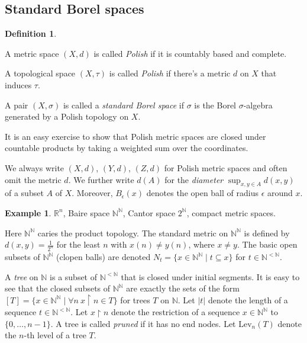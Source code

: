 \documentclass[10pt]{amsart}
\newcommand{\spl}{\mathrm{split}}
\newcommand{\RR}{\mathbb{R}}
\newcommand{\NN}{\mathbb{N}}
\newcommand{\Lev}{\mathrm{Lev}}
\theoremstyle{definition}
\newtheorem{definition}[theorem]{Definition}
\newtheorem{example}[theorem]{Example}
\theoremstyle{remark}
\newenvironment{enumerate-(a)}{\begin{enumerate}[label={\upshape (\alph*)}, leftmargin=2pc]}{\end{enumerate}}
\begin{document}
\subsection{Standard Borel spaces} 

\begin{definition} 
\begin{enumerate-(a)} 
\item 
A metric space $(X,d)$ is called \emph{Polish} if it is countably based and complete. 
\item 
A topological space $(X,\tau)$ is called \emph{Polish} if there's a metric $d$ on $X$ that induces $\tau$. 
\item 
A pair $(X,\sigma)$ is called a \emph{standard Borel space} if $\sigma$ is the Borel $\sigma$-algebra generated by a Polish topology on $X$.  
\end{enumerate-(a)} 
\end{definition} 

It is an easy exercise to show that Polish metric spaces are closed under countable products by taking a weighted sum over the coordinates. 

We always write $(X,d)$, $(Y,d)$, $(Z,d)$ for Polish metric spaces and often omit the metric $d$. 
We further write $d(A)$ for the \emph{diameter} $\sup_{x,y\in A} d(x,y)$ of a subset $A$ of $X$. 
Moreover, $B_\epsilon(x)$ denotes the open ball of radius $\epsilon$ around $x$. 

\begin{example} 
$\RR^n$, Baire space $\NN^\NN$,  Cantor space $2^\NN$, compact metric spaces. 
\end{example} 

Here $\NN^\NN$ caries the product topology. 
The standard metric on $\NN^\NN$ is defined by $d(x,y)=\frac{1}{2^n}$ for the least $n$ with $x(n)\neq y(n)$, where $x\neq y$. 
The basic open subsets of $\NN^\NN$ (clopen balls) are denoted $N_t=\{x\in \NN^\NN\mid t\subseteq x\}$ for $t\in \NN^{<\NN}$. 

A \emph{tree} on $\NN$ is a subset of $\NN^{<\NN}$ that is closed under initial segments. 
It is easy to see that the closed subsets of $\NN^\NN$ are exactly the sets of the form $[T]=\{x\in \NN^\NN\mid \forall n\ x{\upharpoonright}n \in T\}$ for trees $T$ on $\NN$. 
Let $|t|$ denote the length of a sequence $t\in \NN^{<\NN}$. 
Let $x{\upharpoonright}n$ denote the restriction of a sequence $x\in \NN^\NN$ to $\{0,\dots,n-1\}$. 
A tree is called \emph{pruned} if it has no end nodes. 
Let $\Lev_n(T)$ denote the $n$-th level of a tree $T$. 
\end{document}
